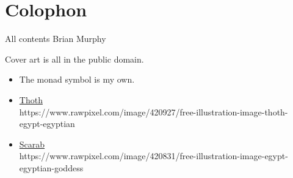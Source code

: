 \documentclass[twoside,10pt]{report}
\newcommand\blankpage{%
    \null
    \thispagestyle{empty}%
    \addtocounter{page}{-1}%
    \newpage%
    \pagestyle{fancy}}
\begin{document}
\chapter{Colophon}
All contents   Brian Murphy\\
\bigskip

Cover art is all in the public domain.

\begin{itemize}
\item The monad symbol is my own.
\item \href{https://www.rawpixel.com/image/420927/free-illustration-image-thoth-egypt-egyptian}{Thoth}\\
https://www.rawpixel.com/image/420927/free-illustration-image-thoth-\\egypt-egyptian
\item \href{https://www.rawpixel.com/image/420831/free-illustration-image-egypt-egyptian-goddess}{Scarab}\\
https://www.rawpixel.com/image/420831/free-illustration-image-egypt-\\egyptian-goddess
\end{itemize}

\afterpage{\blankpage}


\end{document}
